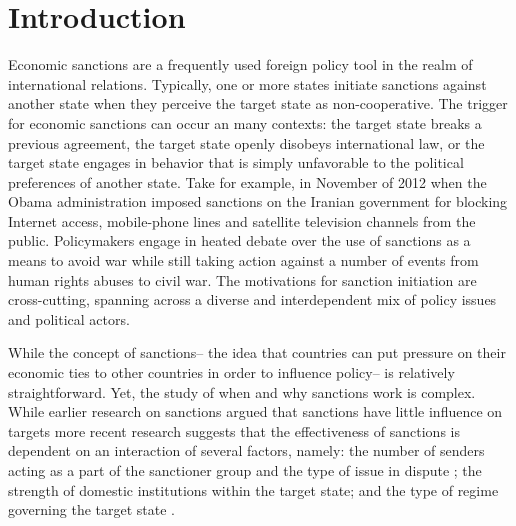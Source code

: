 \section*{Introduction}
\label{intro}

Economic sanctions are a frequently used foreign policy tool in the realm of international relations. Typically, one or more states initiate sanctions against another state when they perceive the target state as non-cooperative. The trigger for economic sanctions can occur an many contexts: the target state breaks a previous agreement, the target state openly disobeys international law, or the target state engages in behavior that is simply unfavorable to the political preferences of another state. Take for example, in November of 2012 when the Obama administration imposed sanctions on the Iranian government for blocking Internet access, mobile-phone lines and satellite television channels from the public. Policymakers engage in heated debate over the use of sanctions as a means to avoid war while still taking action against a number of events from human rights abuses to civil war. The motivations for sanction initiation are cross-cutting, spanning across a diverse and interdependent mix of policy issues and political actors. 

While the concept of sanctions-- the idea that countries can put pressure on their economic ties to other countries in order to influence policy-- is relatively straightforward. Yet, the study of when and why sanctions work is complex. While earlier research on sanctions argued that sanctions have little influence on targets \citep{lam1990, dashti1997, morgan1997, drezner1998} more recent research suggests that the effectiveness of sanctions is dependent on an interaction of several factors, namely: the number of senders acting as a part of the sanctioner group and the type of issue in dispute \citep{miers2002}; the strength of domestic institutions within the target state; and the type of regime governing the target state \citep{mcgillivray2004}. 

